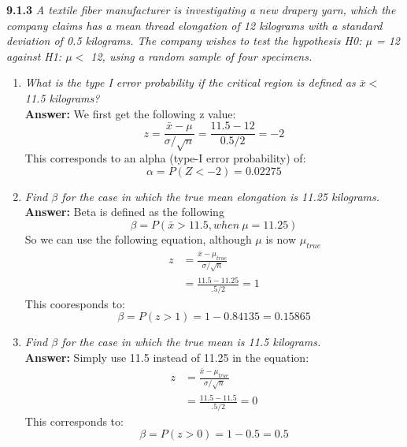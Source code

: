 \documentclass[11pt]{article}
\begin{document}
\noindent \textbf{9.1.3} \emph{ A textile fiber manufacturer is investigating a new drapery yarn, which the company claims has a mean thread elongation of 12 kilograms with a standard deviation of 0.5 kilograms. The company wishes to test the hypothesis H0: $\mu$ = 12 against H1: $\mu <$ 12, using a random sample of four specimens.}
\begin{enumerate}
\item \emph{What is the type I error probability if the critical region is defined as $\bar{x} <$ 11.5 kilograms?}
\\\textbf{Answer:}
We first get the following z value:
\begin{equation}
z = \frac{\bar{x} - \mu}{\sigma/\sqrt{n}} = \frac{11.5 - 12}{0.5/2} = -2
\end{equation}
This corresponds to an alpha (type-I error probability) of:
\begin{equation}
\alpha = P(Z < -2) = 0.02275
\end{equation}
\item \emph{Find $\beta$ for the case in which the true mean elongation is 11.25 kilograms.}
\\\textbf{Answer:}
Beta is defined as the following
\begin{equation}
\beta = P(\bar{x} > 11.5, when\ \mu =11.25)
\end{equation}
So we can use the following equation, although $\mu$ is now $\mu_{true}$
\begin{equation}
\begin{split}
z &= \frac{\bar{x} - \mu_{true}}{\sigma/\sqrt{n}}\\
&= \frac{11.5 - 11.25}{.5/2} = 1
\end{split}
\end{equation}
This cooresponds to:
\begin{equation}
\beta = P(z > 1)=  1 - 0.84135 = 0.15865
\end{equation}
\item \emph{Find $\beta$ for the case in which the true mean is 11.5 kilograms.}
\\\textbf{Answer:}
Simply use 11.5 instead of 11.25 in the equation:
\begin{equation}
\begin{split}
z &= \frac{\bar{x} - \mu_{true}}{\sigma/\sqrt{n}}\\
&= \frac{11.5 - 11.5}{.5/2} = 0
\end{split}
\end{equation}
This corresponds to: 
\begin{equation}
\beta = P(z > 0)=  1 - 0.5 =0.5
\end{equation}
\end{enumerate}
\end{document}

